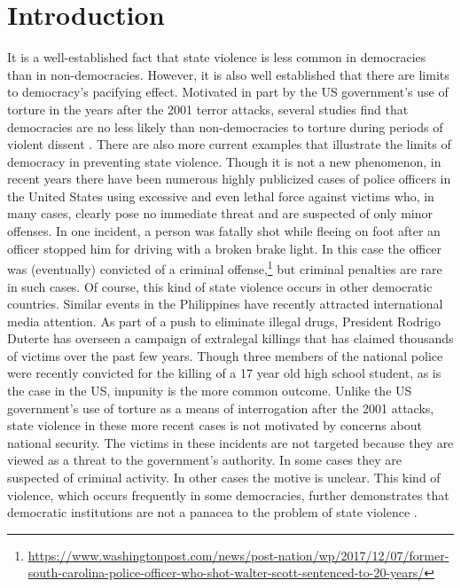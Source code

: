 \documentclass[11pt]{article}
\begin{document}
\section*{Introduction}
It is a well-established fact that state violence is less common in democracies than in non-democracies. However, it is also well established that there are limits to democracy's pacifying effect. Motivated in part by the US government's use of torture in the years after the 2001 terror attacks, several studies find that democracies are no less likely than non-democracies to torture during periods of violent dissent \citep{Davenport2007AR,Davenport2007,DavenportMooreArmstrong2007,ConradMoore2010}. There are also more current examples that illustrate the limits of democracy in preventing state violence. Though it is not a new phenomenon, in recent years there have been numerous highly publicized cases of police officers in the United States using excessive and even lethal force against victims who, in many cases, clearly pose no immediate threat and are suspected of only minor offenses. In one incident, a person was fatally shot while fleeing on foot after an officer stopped him for driving with a broken brake light. In this case the officer was (eventually) convicted of a criminal offense,\footnote{\url{https://www.washingtonpost.com/news/post-nation/wp/2017/12/07/former-south-carolina-police-officer-who-shot-walter-scott-sentenced-to-20-years/}} but criminal penalties are rare in such cases. Of course, this kind of state violence occurs in other democratic countries. Similar events in the Philippines have recently attracted international media attention. As part of a push to eliminate illegal drugs, President Rodrigo Duterte has overseen a campaign of extralegal killings that has claimed thousands of victims over the past few years. Though three members of the national police were recently convicted for the killing of a 17 year old high school student, as is the case in the US, impunity is the more common outcome. Unlike the US government's use of torture as a means of interrogation after the 2001 attacks, state violence in these more recent cases is not motivated by concerns about national security. The victims in these incidents are not targeted because they are viewed as a threat to the government's authority. In some cases they are suspected of criminal activity. In other cases the motive is unclear. This kind of violence, which occurs frequently in some democracies, further demonstrates that democratic institutions are not a panacea to the problem of state violence \citep{Moore2010}.  
\end{document}
